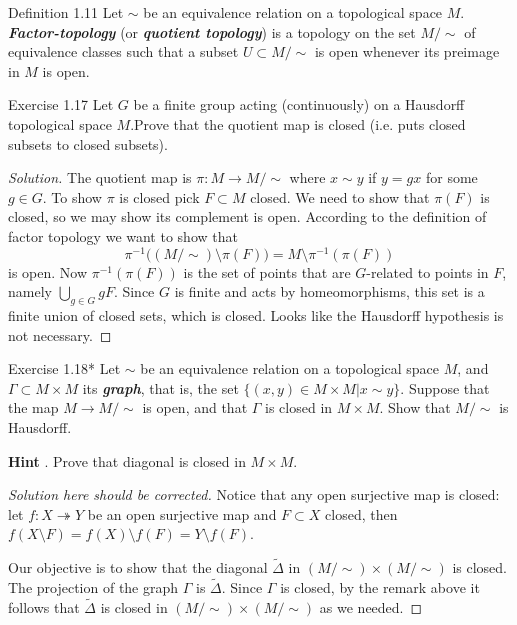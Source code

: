 \begin{thing3}{Definition 1.11}\leavevmode
	Let $\sim$ be an equivalence relation on a topological space $M$. \textit{\textbf{Factor-topology}} (or \textit{\textbf{quotient topology}}) is a topology on the set $M/\sim$ of equivalence classes such that a subset $U \subset M/\sim$ is open whenever its preimage in $M$ is open.
\end{thing3}

\begin{thing4}{Exercise 1.17}\label{exer:1.17}\leavevmode
	Let $G$ be a finite group acting (continuously) on a Hausdorff topological space $M$.Prove that the quotient map is closed (i.e. puts closed subsets to closed subsets).
\end{thing4}

\begin{proof}[Solution]\leavevmode
The quotient map is $\pi:M\to M/\sim$ where $x \sim y$ if $y=gx$ for some  $g \in G$. To show $\pi$ is closed pick $F \subset M$ closed. We need to show that $\pi(F)$ is closed, so we may show its complement is open. According to the definition of factor topology we want to show that
\[\pi^{-1}\Big((M/\sim) \setminus \pi(F)\Big)=M\setminus\pi^{-1}(\pi(F))\]
is open. Now $\pi^{-1}(\pi(F))$ is the set of points that are $G$-related to points in  $F$, namely $\bigcup_{g \in G} gF$. Since $G$ is finite and  acts by homeomorphisms, this set is a finite union of closed sets, which is closed. {\color{7}Looks like the Hausdorff hypothesis is not necessary.}
\end{proof}

\begin{thing4}{Exercise 1.18*}\leavevmode
	Let $\sim$ be an equivalence relation on a topological space $M$, and $\Gamma \subset M \times M$ its \textit{\textbf{graph}}, that is, the set $\{(x,y) \in M \times M|x \sim y\}$. Suppose that the map $M \longrightarrow M/\sim$ is open, and that $\Gamma$ is closed in $M \times M$. Show that $M/\sim$ is Hausdorff.

	\textbf{Hint} . Prove that diagonal is closed in $M \times M$.
\end{thing4}

\begin{proof}[{\color{2}Solution here should be corrected}]\leavevmode
Notice that any open surjective map is closed: let $f:X \twoheadrightarrow Y$ be an open surjective map and $F\subset X$ closed, then $f(X\setminus F)=f(X)\setminus f(F)=Y\setminus f(F)$.

Our objective is to show that the diagonal $\tilde{\Delta}$ in $(M/\sim)\times(M/\sim)$ is closed. The projection of the graph $\Gamma$ is $\tilde{\Delta}$. Since $\Gamma$ is closed, by the remark above it follows that $\tilde{\Delta}$ is closed in $(M/\sim)\times(M/\sim)$ as we needed.
\end{proof}

